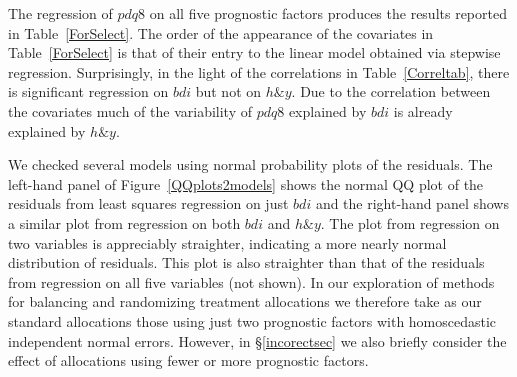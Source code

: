 \documentclass[number,12pt,review]{elsarticle}
\begin{document}
The regression of $pdq8$ on all five prognostic factors produces the results reported in Table~\ref{ForSelect}.
The order of the appearance of the covariates in Table~\ref{ForSelect} is that
of their entry to the linear model obtained via stepwise regression.
Surprisingly, in the light of the correlations in Table~\ref{Correltab}, there is significant regression on
$bdi$ but not on $h\&y$. Due to the correlation between the covariates much of the variability of $pdq8$ explained by $bdi$ is already explained by $h\&y$.

\begin{table}[ht]
\end{table}

We checked several models using normal probability plots of the residuals.  The left-hand panel of Figure~\ref{QQplots2models} shows the normal QQ plot of the residuals from least squares regression on just  $bdi$ and the right-hand panel shows a similar plot from regression on both $bdi$ and $h\&y$.
The plot from regression on two variables is appreciably straighter, indicating a more nearly normal distribution of residuals. This plot is also straighter than that of the residuals from regression on all five variables (not shown). In our exploration of methods for balancing and randomizing treatment allocations we therefore take as our standard allocations those using just two prognostic factors with homoscedastic independent normal errors. However, in \S\ref{incorectsec} we also briefly consider the effect of allocations using fewer or more prognostic factors.
\end{document}
